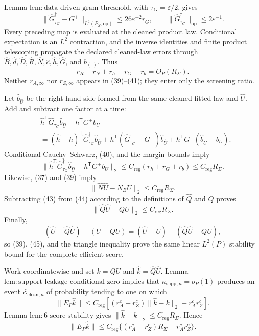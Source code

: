 Lemma \(\mathrm{lem{:}data\mbox{-}driven\mbox{-}gram\mbox{-}threshold}\), with \(\tau_G=\varepsilon/2\), gives
\[
 \|\widehat G_{\tau_G}^{\dagger}-G^+\|_{L^2(P_X;\mathrm{op})}
 \leq26\varepsilon^{-2}r_G,\qquad
 \|\widehat G_{\tau_G}^{\dagger}\|_{\mathrm{op}}\leq2\varepsilon^{-1}. \tag{40}
\]
Every preceding map is evaluated at the cleaned product law.  Conditional expectation is an \(L^2\) contraction, and the inverse identities and finite product telescoping propagate the declared cleaned-law errors through \(\widehat B,\widehat d,\widehat D,\widehat R,\widehat N,\widehat c,\widehat h,\widehat G\), and \(\widehat b_{(\cdot)}\).  Thus
\[
 r_R+r_N+r_h+r_G+r_b=O_P(R_\Sigma). \tag{41}
\]
Neither \(r_{A,\infty}\) nor \(r_{Z,\infty}\) appears in (39)--(41); they enter only the screening ratio.

Let \(\widehat b_{\widehat U}\) be the right-hand side formed from the same cleaned fitted law and \(\widehat U\).  Add and subtract one factor at a time:
\[
\begin{aligned}
 &\widehat h^{\mathsf T}\widehat G_{\tau_G}^{\dagger}\widehat b_{\widehat U}
   -h^{\mathsf T}G^+b_U\\
 &=(\widehat h-h)^{\mathsf T}\widehat G_{\tau_G}^{\dagger}\widehat b_{\widehat U}
   +h^{\mathsf T}(\widehat G_{\tau_G}^{\dagger}-G^+)\widehat b_{\widehat U}
   +h^{\mathsf T}G^+(\widehat b_{\widehat U}-b_U).
\end{aligned} \tag{42}
\]
Conditional Cauchy--Schwarz, (40), and the margin bounds imply
\[
 \|\widehat h^{\mathsf T}\widehat G_{\tau_G}^{\dagger}\widehat b_{\widehat U}
   -h^{\mathsf T}G^+b_U\|_2
 \leq C_{\mathrm{reg}}(r_h+r_G+r_b)
 \leq C_{\mathrm{reg}}R_\Sigma. \tag{43}
\]
Likewise, (37) and (39) imply
\[
 \|\widehat N\widehat U-N_BU\|_2
 \leq C_{\mathrm{reg}}R_\Sigma. \tag{44}
\]
Subtracting (43) from (44) according to the definitions of \(\widehat Q\) and \(Q\) proves
\[
 \|\widehat Q\widehat U-QU\|_2\leq C_{\mathrm{reg}}R_\Sigma. \tag{45}
\]
Finally,
\[
(\widehat U-\widehat Q\widehat U)-(U-QU)
=(\widehat U-U)-(\widehat Q\widehat U-QU),
\]
so (39), (45), and the triangle inequality prove the same linear \(L^2(P)\) stability bound for the complete efficient score.

Work coordinatewise and set \(k=QU\) and \(\widehat k=\widehat Q\widehat U\).  Lemma \(\mathrm{lem{:}support\mbox{-}leakage\mbox{-}conditional\mbox{-}zero}\) implies that \(\kappa_{\mathrm{supp},n}=o_P(1)\) produces an event \(\mathcal E_{\mathrm{clean},n}\) of probability tending to one on which
\[
 \|E_P\widehat k\|
 \leq C_{\mathrm{reg}}
 \left[(r_A^c+r_Z^c)\|\widehat k-k\|_2+r_A^cr_Z^c\right]. \tag{46}
\]
Lemma \(\mathrm{lem{:}6\mbox{-}score\mbox{-}stability}\) gives
\(\|\widehat k-k\|_2\leq C_{\mathrm{reg}}R_\Sigma\).  Hence
\[
 \|E_P\widehat k\|
 \leq C_{\mathrm{reg}}\{(r_A^c+r_Z^c)R_\Sigma+r_A^cr_Z^c\}. \tag{47}
\]

